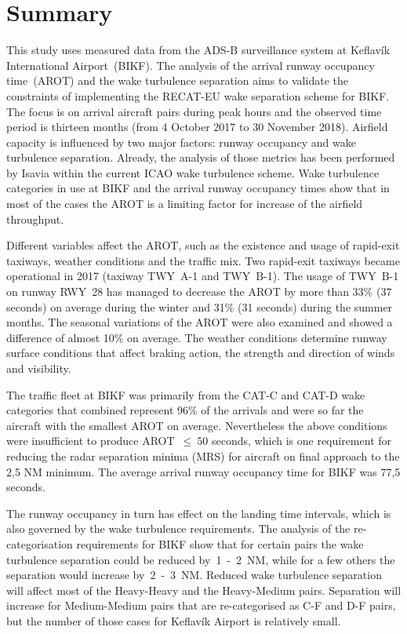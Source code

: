 




\chapter{Summary}\label{cha:summary}
This study uses measured data from the ADS-B surveillance system at Keflavík International Airport~(BIKF). The analysis of the arrival runway occupancy time~(AROT) and the wake turbulence separation aims to validate the constraints of implementing the RECAT-EU wake  separation scheme for BIKF. The focus is on arrival aircraft pairs during peak hours and the observed time period is thirteen months (from 4 October 2017 to 30 November 2018). 
Airfield capacity is influenced by two major factors: runway occupancy and wake turbulence separation. Already, the analysis of those metrics has been performed by Isavia within the current ICAO wake turbulence scheme. Wake turbulence categories in use at BIKF and the arrival runway occupancy times show that in most of the cases the AROT is a limiting factor for increase of the airfield throughput.  

Different variables affect the AROT, such as the existence and usage of rapid-exit taxiways, weather conditions and the traffic mix. Two rapid-exit taxiways became operational in 2017 (taxiway TWY~A-1 and TWY~B-1). The usage of TWY~B-1 on runway RWY~28 has managed to decrease the AROT by more than 33\% (37 seconds) on average during the winter and 31\% (31 seconds) during the summer months. The seasonal variations of the AROT were also examined and showed a difference of almost 10\% on average. The weather conditions determine runway surface conditions that affect braking action, the strength and direction of winds and visibility. 

The traffic fleet at BIKF was primarily from the CAT-C and CAT-D wake categories that combined represent 96\% of the arrivals and were so far the aircraft with the smallest AROT on average. Nevertheless the above conditions were insufficient to produce AROT~$\leq~50$ seconds, which is one requirement for reducing the radar separation minima (MRS) for aircraft on final approach to the 2,5 NM minimum. The average arrival runway occupancy time for BIKF was 77,5 seconds. 

The runway occupancy in turn has effect on the landing time intervals, which is also governed by the wake turbulence requirements.
The analysis of the re-categorisation requirements for BIKF show that for certain pairs the wake turbulence separation could be reduced by~1~-~2~NM, while for a few others the separation would increase by~2~-~3~NM. Reduced wake turbulence separation will affect most of the Heavy-Heavy and the Heavy-Medium pairs. Separation will increase for Medium-Medium pairs that are re-categorised as C-F and D-F pairs, but the number of those cases for Keflavík Airport is relatively small.


